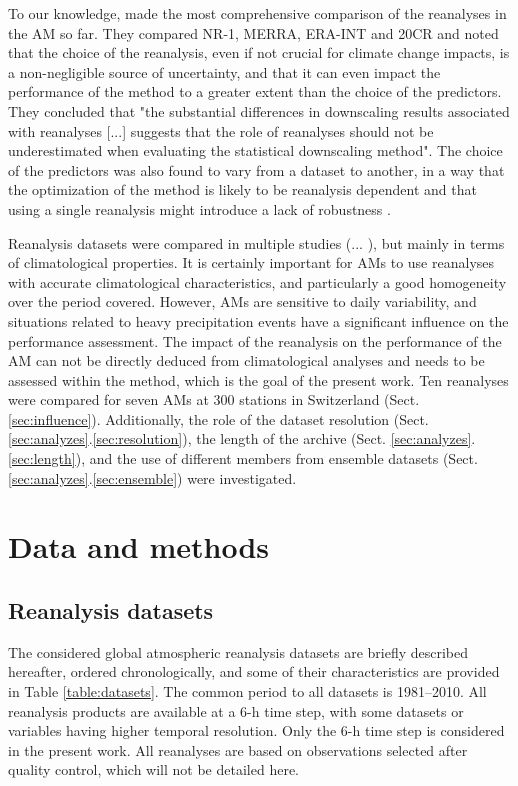 \documentclass{ametsoc}
\begin{document}
To our knowledge, \citet{Dayon2015} made the most comprehensive comparison of the reanalyses in the AM so far. They compared NR-1, MERRA, ERA-INT and 20CR and noted that the choice of the reanalysis, even if not crucial for climate change impacts, is a non-negligible source of uncertainty, and that it can even impact the performance of the method to a greater extent than the choice of the predictors. They concluded that "the substantial differences in downscaling results associated with reanalyses [...] suggests that the role of reanalyses should not be underestimated when evaluating the statistical downscaling method". The choice of the predictors was also found to vary from a dataset to another, in a way that the optimization of the method is likely to be reanalysis dependent and that using a single reanalysis might introduce a lack of robustness \citep{Dayon2015}.

Reanalysis datasets were compared in multiple studies (... ), but mainly in terms of climatological properties. It is certainly important for AMs to use reanalyses with accurate climatological characteristics, and particularly a good homogeneity over the period covered. However, AMs are sensitive to daily variability, and situations related to heavy precipitation events have a significant influence on the performance assessment. The impact of the reanalysis on the performance of the AM can not be directly deduced from climatological analyses and needs to be assessed within the method, which is the goal of the present work. Ten reanalyses were compared for seven AMs at 300 stations in Switzerland (Sect. \ref{sec:influence}). Additionally, the role of the dataset resolution (Sect. \ref{sec:analyzes}.\ref{sec:resolution}), the length of the archive (Sect. \ref{sec:analyzes}.\ref{sec:length}), and the use of different members from ensemble datasets (Sect. \ref{sec:analyzes}.\ref{sec:ensemble}) were investigated.


\section{Data and methods}
\label{sec:data}

\subsection{Reanalysis datasets}

The considered global atmospheric reanalysis datasets are briefly described hereafter, ordered chronologically, and some of their characteristics are provided in Table \ref{table:datasets}. The common period to all datasets is 1981--2010. All reanalysis products are available at a 6-h time step, with some datasets or variables having higher temporal resolution. Only the 6-h time step is considered in the present work. All reanalyses are based on observations selected after quality control, which will not be detailed here. 
\end{document}
